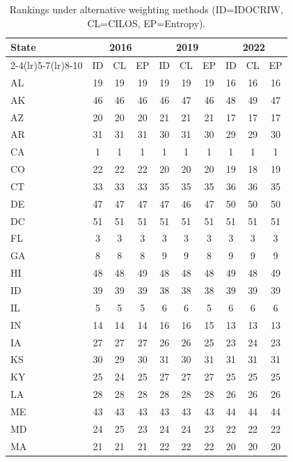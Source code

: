 \documentclass{article}
\newcounter{subsubsubsection}[subsubsection]
\begin{document}
\begin{table}[H]
\centering
\caption{Rankings under alternative weighting methods (ID=IDOCRIW, CL=CILOS, EP=Entropy).\label{tab:inter-unc}}
\scriptsize
\setlength{\tabcolsep}{2.5pt}
\begin{tabular}{l*{9}{c}}
\toprule
\multirow{2}{*}{State} & \multicolumn{3}{c}{2016} & \multicolumn{3}{c}{2019} & \multicolumn{3}{c}{2022} \\
\cmidrule(lr){2-4}\cmidrule(lr){5-7}\cmidrule(lr){8-10}
 & ID & CL & EP & ID & CL & EP & ID & CL & EP \\
\midrule
AL & 19 & 19 & 19 & 19 & 19 & 19 & 16 & 16 & 16 \\
AK & 46 & 46 & 46 & 46 & 47 & 46 & 48 & 49 & 47 \\
AZ & 20 & 20 & 20 & 21 & 21 & 21 & 17 & 17 & 17 \\
AR & 31 & 31 & 31 & 30 & 31 & 30 & 29 & 29 & 30 \\
CA & 1 & 1 & 1 & 1 & 1 & 1 & 1 & 1 & 1 \\
CO & 22 & 22 & 22 & 20 & 20 & 20 & 19 & 18 & 19 \\
CT & 33 & 33 & 33 & 35 & 35 & 35 & 36 & 36 & 35 \\
DE & 47 & 47 & 47 & 47 & 46 & 47 & 50 & 50 & 50 \\
DC & 51 & 51 & 51 & 51 & 51 & 51 & 51 & 51 & 51 \\
FL & 3 & 3 & 3 & 3 & 3 & 3 & 3 & 3 & 3 \\
GA & 8 & 8 & 8 & 9 & 9 & 8 & 9 & 9 & 9 \\
HI & 48 & 48 & 49 & 48 & 48 & 48 & 49 & 48 & 49 \\
ID & 39 & 39 & 39 & 38 & 38 & 38 & 39 & 39 & 39 \\
IL & 5 & 5 & 5 & 6 & 6 & 5 & 6 & 6 & 6 \\
IN & 14 & 14 & 14 & 16 & 16 & 15 & 13 & 13 & 13 \\
IA & 27 & 27 & 27 & 26 & 26 & 25 & 23 & 24 & 23 \\
KS & 30 & 29 & 30 & 31 & 30 & 31 & 31 & 31 & 31 \\
KY & 25 & 24 & 25 & 27 & 27 & 27 & 25 & 25 & 25 \\
LA & 28 & 28 & 28 & 28 & 28 & 28 & 26 & 26 & 26 \\
ME & 43 & 43 & 43 & 43 & 43 & 43 & 44 & 44 & 44 \\
MD & 24 & 25 & 23 & 24 & 24 & 23 & 22 & 22 & 22 \\
MA & 21 & 21 & 21 & 22 & 22 & 22 & 20 & 20 & 20 \\

\end{tabular}
\end{table}
\end{document}

